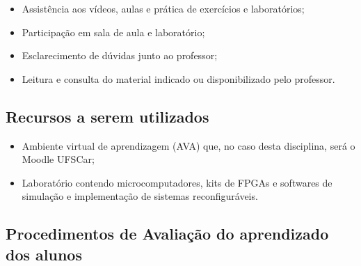 \begin{frame}[allowframebreaks]{\insertsubsection}
	\begin{itemize}
		\item Assistência aos vídeos, aulas e prática de exercícios e laboratórios;
		\item Participação em sala de aula e laboratório;
		\item Esclarecimento de dúvidas junto ao professor;
		\item Leitura e consulta do material indicado ou disponibilizado pelo professor.
	\end{itemize}
\end{frame}

\subsection{Recursos a serem utilizados} %

\begin{frame}{\insertsubsection} 
	\begin{itemize}
	    \item Ambiente virtual de aprendizagem (AVA) que, no caso desta disciplina, será o Moodle UFSCar;
        \item Laboratório contendo microcomputadores, kits de FPGAs e softwares de simulação e implementação de sistemas reconfiguráveis.
		\end{itemize}
\end{frame}

\subsection{Procedimentos de Avaliação do aprendizado dos alunos} %

